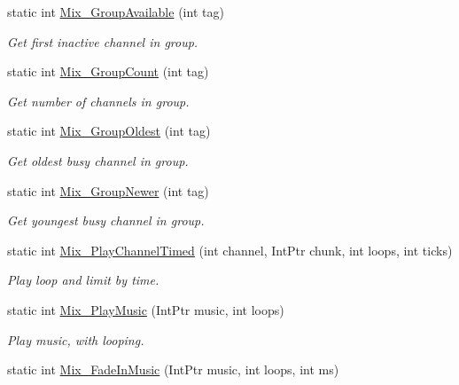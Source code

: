 \begin{DoxyCompactItemize}
static int \hyperlink{namespace_tao_1_1_sdl_a67e7ccad21a7ad337e1d8292b1f041d2}{Mix\_\-GroupAvailable} (int tag)
\begin{DoxyCompactList}\small\item\em Get first inactive channel in group. \item\end{DoxyCompactList}\item 
static int \hyperlink{namespace_tao_1_1_sdl_a1fc24e0dafaca9516fd3333180eafdc3}{Mix\_\-GroupCount} (int tag)
\begin{DoxyCompactList}\small\item\em Get number of channels in group. \item\end{DoxyCompactList}\item 
static int \hyperlink{namespace_tao_1_1_sdl_a7463f2901ab6cb6f772f740b05be3773}{Mix\_\-GroupOldest} (int tag)
\begin{DoxyCompactList}\small\item\em Get oldest busy channel in group. \item\end{DoxyCompactList}\item 
static int \hyperlink{namespace_tao_1_1_sdl_a0410718cb0a5036507a4e873cdf5f936}{Mix\_\-GroupNewer} (int tag)
\begin{DoxyCompactList}\small\item\em Get youngest busy channel in group. \item\end{DoxyCompactList}\item 
static int \hyperlink{namespace_tao_1_1_sdl_a3158db8e72b34c092d51b0ba70ebfccf}{Mix\_\-PlayChannelTimed} (int channel, IntPtr chunk, int loops, int ticks)
\begin{DoxyCompactList}\small\item\em Play loop and limit by time. \item\end{DoxyCompactList}\item 
static int \hyperlink{namespace_tao_1_1_sdl_aebe0f1bba92653f0f1dea238300619fb}{Mix\_\-PlayMusic} (IntPtr music, int loops)
\begin{DoxyCompactList}\small\item\em Play music, with looping. \item\end{DoxyCompactList}\item 
static int \hyperlink{namespace_tao_1_1_sdl_a67b90a673af55a36597265d2720f9ef5}{Mix\_\-FadeInMusic} (IntPtr music, int loops, int ms)

\end{DoxyCompactItemize}
